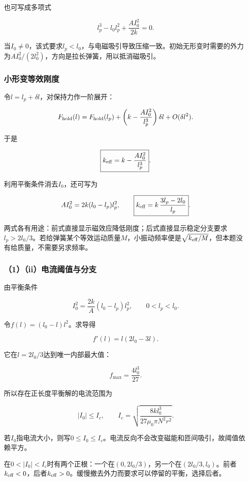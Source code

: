 \documentclass[12pt,a4paper,fontset=fandol]{ctexart}
\begin{document}
也可写成多项式

\[
\boxed{l_p^3-l_0l_p^2+\frac{AI_0^2}{2k}=0}.
\]

当\(I_0\neq0\)，该式要求\(l_p<l_0\)，与电磁吸引导致压缩一致。初始无形变时需要的外力为\(AI_0^2/(2l_0^2)\)，方向是拉长弹簧，用以抵消磁吸引。

\subsubsection{小形变等效刚度}\label{ux5c0fux5f62ux53d8ux7b49ux6548ux521aux5ea6}

令\(l=l_p+\delta l\)，对保持力作一阶展开：

\[
F_{\rm hold}(l)
=F_{\rm hold}(l_p)
+\left(k-\frac{AI_0^2}{l_p^3}\right)\delta l
+O(\delta l^2).
\]

于是

\[
\boxed{k_{\rm eff}=k-\frac{AI_0^2}{l_p^3}}.
\]

利用平衡条件消去\(I_0\)，还可写为

\[
AI_0^2=2k(l_0-l_p)l_p^2,
\qquad
\boxed{k_{\rm eff}=k\,\frac{3l_p-2l_0}{l_p}}.
\]

两式各有用途：前式直接显示磁效应降低刚度；后式直接显示稳定分支要求\(l_p>2l_0/3\)。若给弹簧某个等效运动质量\(M\)，小振动频率便是\(\sqrt{k_{\rm eff}/M}\)，但本题没有给质量，不需要另求频率。

\subsubsection{（1）（ii）电流阈值与分支}\label{iiux7535ux6d41ux9608ux503cux4e0eux5206ux652f}

由平衡条件

\[
I_0^2=\frac{2k}{A}(l_0-l_p)l_p^2,
\qquad 0<l_p<l_0.
\]

令\(f(l)=(l_0-l)l^2\)。求导得

\[
f'(l)=l(2l_0-3l).
\]

它在\(l=2l_0/3\)达到唯一内部最大值：

\[
f_{\max}=\frac{4l_0^3}{27}.
\]

所以存在正长度平衡解的电流范围为

\[
\boxed{|I_0|\leq I_c,\qquad
I_c=\sqrt{\frac{8kl_0^3}{27\mu_0\pi N^2r^2}}}.
\]

若\(I_0\)指电流大小，则写\(0\leq I_0\leq I_c\)。电流反向不会改变磁能和匝间吸引，故阈值依赖平方。

在\(0<|I_0|<I_c\)时有两个正根：一个在\((0,2l_0/3)\)，另一个在\((2l_0/3,l_0)\)。前者\(k_{\rm eff}<0\)，后者\(k_{\rm eff}>0\)。缓慢撤去外力而要求可以停留的平衡，选择后者。
\end{document}
